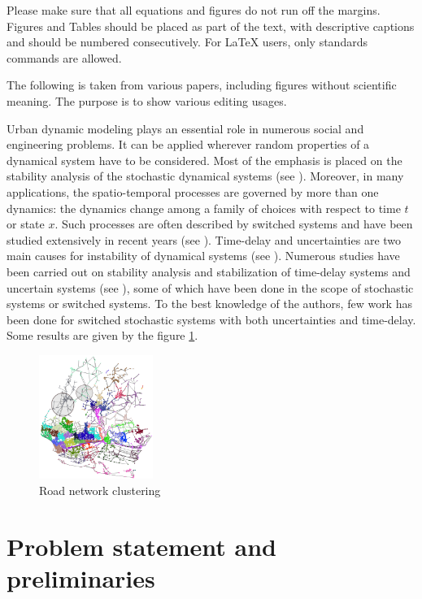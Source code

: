 \documentclass[a4paper,twocolumn,twoside,10pt]{article}
\theoremstyle{definition}
\begin{document}
Please make sure that all equations and figures do not run off the
margins. Figures and Tables should be placed as part of the text, with descriptive captions and should be numbered consecutively. For LaTeX users, only standards commands are allowed.

The following is taken from various papers, including figures without scientific meaning. The purpose is to show various editing usages. 


Urban dynamic modeling plays an
essential role in numerous social and engineering problems. It can
be applied wherever random properties of a dynamical system have to
be considered. Most of the emphasis is placed on the stability
analysis of the stochastic dynamical systems (see
\cite{Arnold}). Moreover, in many applications,
the spatio-temporal processes are governed by more than one
dynamics: the dynamics change among a family of choices with respect
to time $t$ or state $x$. Such processes are often described by
switched systems and have been studied extensively in recent years
(see \cite{Cheng, daaf}). Time-delay and uncertainties are two
main causes for instability of dynamical systems (see
\cite{Boyd}). Numerous studies have been carried out on
stability analysis and stabilization of time-delay systems and
uncertain systems (see
\cite{Cao,Chen}), some of which have
been done in the scope of stochastic systems or switched systems. To
the best knowledge of the authors, few work has been done for
switched stochastic systems with both uncertainties and time-delay.
Some results are given by the figure \ref{onesurface}.

\begin{figure}[htp]
\centering
\includegraphics[width=0.33\textwidth]{codahComm.png}
\caption{Road network clustering}
\label{onesurface}
\end{figure}


\section{Problem statement and preliminaries}\label{sec2}
\end{document}
